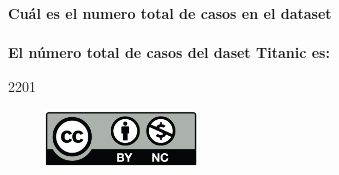 \documentclass[12pt]{report}
\begin{document}
\textbf{Cuál es el numero total de casos en el dataset}\\\\

\textbf{El número total de casos del daset Titanic es:}\\

\begin{Schunk}
\begin{Soutput}
[1] 2201
\end{Soutput}
\end{Schunk}

\begin{center}
\includegraphics[width=6cm, height=1.5cm]{cc.jpg}
\end{center}
\end{document}
